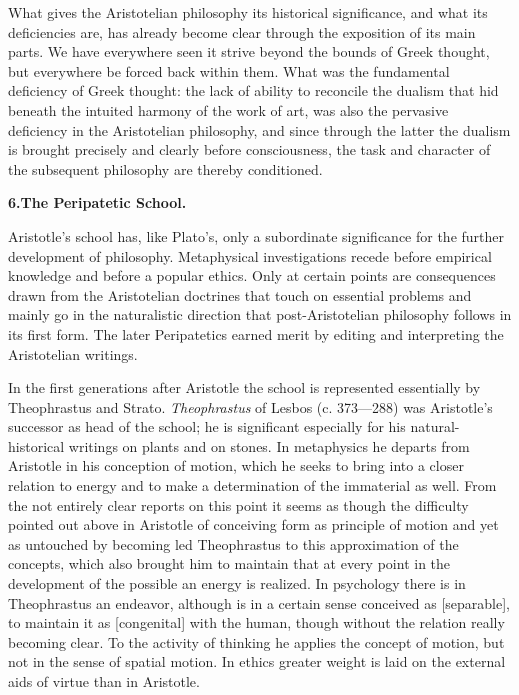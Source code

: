 \divrule

What gives the Aristotelian philosophy its historical
significance, and what its deficiencies are, has already become
clear through the exposition of its main parts. We have
everywhere seen it strive beyond the bounds of Greek thought,
but everywhere be forced back within them. What was
the fundamental deficiency of Greek thought: the lack of ability
to reconcile the dualism that hid beneath the intuited harmony of the work of art, was also the pervasive deficiency in
the Aristotelian philosophy, and since through the latter the dualism
is brought precisely and clearly before consciousness, the task and character of the
subsequent philosophy are thereby conditioned.

\divrule

\begin{center}
\textbf{6.\enspace The Peripatetic School.}
\end{center}

Aristotle's school has, like Plato's, only a subordinate significance for the further development of philosophy. Metaphysical investigations recede before empirical
knowledge and before a popular ethics. Only at certain points
are consequences drawn from the Aristotelian doctrines that
touch on essential problems and mainly go in the
naturalistic direction that post-Aristotelian philosophy
follows in its first form. The later Peripatetics earned
merit by editing and interpreting the Aristotelian writings.

In the first generations after Aristotle the school is represented
essentially by Theophrastus and Strato. \emph{Theophrastus} of Lesbos (c. 373---288) was Aristotle's successor as
head of the school; he is significant especially for his natural-historical writings on plants and on stones. In metaphysics he departs from Aristotle in his conception of
motion, which he seeks to bring into a closer relation
to energy and to make a determination of the immaterial as well. From the not entirely clear reports on this
point it seems as though the difficulty pointed out above in Aristotle
of conceiving form as principle of motion
and yet as untouched by becoming led Theophrastus to this
approximation of the concepts, which also brought him to maintain that at every point in the development of the possible
an energy is realized. In psychology there is in Theophrastus an endeavor, although  is in a certain sense conceived
as  [separable], to maintain it as  [congenital] with the human, though without the relation really becoming clear. To the activity of thinking he applies the concept of motion, but not in
the sense of spatial motion. In ethics greater
weight is laid on the external aids of virtue than in Aristotle.

